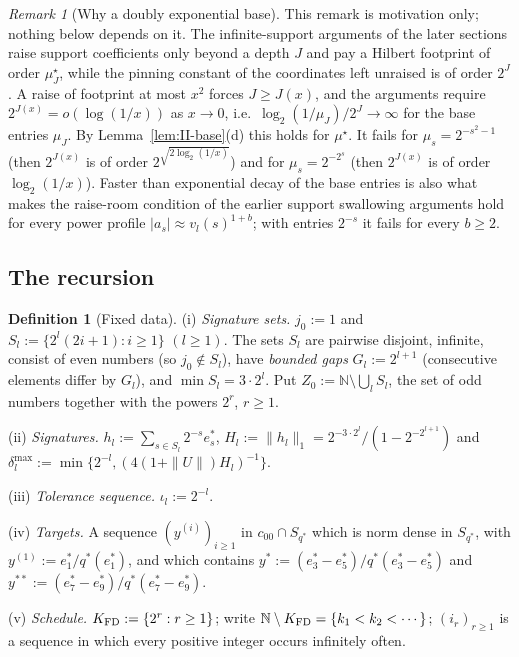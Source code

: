 \documentclass[10pt]{amsart}
\theoremstyle{definition}
\newtheorem{definition}[theorem]{Definition}
\theoremstyle{remark}
\newtheorem{remark}[theorem]{Remark}
\newcommand{\N}{\mathbb N}
\begin{document}
\begin{remark}[Why a doubly exponential base]\label{rem:II-whybase}
This remark is motivation only; nothing below depends on it.  The
infinite-support arguments of the later sections raise support
coefficients only beyond a depth $J$ and pay a Hilbert footprint of
order $\mu^\star_J$, while the pinning constant of the coordinates left
unraised is of order $2^J$.  A raise of footprint at most $x^2$ forces
$J\ge J(x)$, and the arguments require $2^{J(x)}=o(\log(1/x))$ as
$x\to0$, i.e.\ $\log_2(1/\mu_J)/2^J\to\infty$ for the base entries
$\mu_J$.  By Lemma~\ref{lem:II-base}(d) this holds for $\mu^\star$.  It
fails for $\mu_s=2^{-s^2-1}$ (then $2^{J(x)}$ is of order
$2^{\sqrt{2\log_2(1/x)}}$) and for $\mu_s=2^{-2^s}$ (then $2^{J(x)}$ is of
order $\log_2(1/x)$).  Faster than exponential decay of the base entries
is also what makes the raise-room condition of the earlier support
swallowing arguments hold for every power profile
$|a_s|\approx v_l(s)^{1+b}$; with entries $2^{-s}$ it fails for every
$b\ge2$.
\end{remark}

\subsection{The recursion}

\begin{definition}[Fixed data]\label{def:II-data}
\textup{(i)} \emph{Signature sets.}  $j_0:=1$ and
$S_l:=\{2^l(2i+1):i\ge1\}$ $(l\ge1)$.  The sets $S_l$ are pairwise
disjoint, infinite, consist of even numbers (so $j_0\notin S_l$), have
\emph{bounded gaps} $G_l:=2^{l+1}$ (consecutive elements differ by $G_l$),
and $\min S_l=3\cdot2^l$.  Put $Z_0:=\N\setminus\bigcup_lS_l$, the set of
odd numbers together with the powers $2^r$, $r\ge1$.

\textup{(ii)} \emph{Signatures.}
$h_l:=\sum_{s\in S_l}2^{-s}e_s^*$,
$H_l:=\|h_l\|_1=2^{-3\cdot2^l}/(1-2^{-2^{l+1}})$ and
$\delta^{\max}_l:=\min\{2^{-l},(4(1+\|U\|)H_l)^{-1}\}$.

\textup{(iii)} \emph{Tolerance sequence.}  $\iota_l:=2^{-l}$.

\textup{(iv)} \emph{Targets.}  A sequence $(y^{(i)})_{i\ge1}$ in
$c_{00}\cap S_{q^*}$ which is norm dense in $S_{q^*}$, with
$y^{(1)}:=e_1^*/q^*(e_1^*)$, and which contains
$y^\ast:=(e_3^*-e_5^*)/q^*(e_3^*-e_5^*)$ and
$y^{\ast\ast}:=(e_7^*-e_9^*)/q^*(e_7^*-e_9^*)$.

\textup{(v)} \emph{Schedule.}  $K_{\rm FD}:=\{2^r:r\ge1\}$; write
$\N\setminus K_{\rm FD}=\{k_1<k_2<\cdots\}$; $(i_r)_{r\ge1}$ is a sequence
in which every positive integer occurs infinitely often.
\end{definition}
\end{document}
